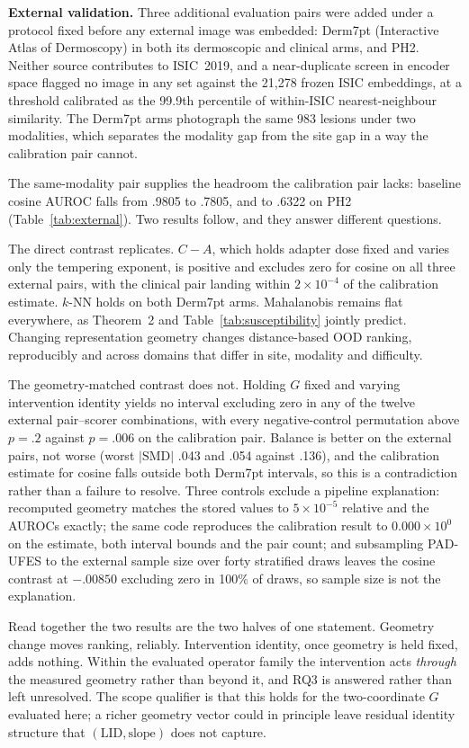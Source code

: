\documentclass[11pt,a4paper]{article}
\begin{document}
\label{sec:external}
\textbf{External validation.} Three additional evaluation pairs were added under a protocol fixed before any external image was embedded: Derm7pt (Interactive Atlas of Dermoscopy) in both its dermoscopic and clinical arms, and PH2. Neither source contributes to ISIC~2019, and a near-duplicate screen in encoder space flagged no image in any set against the 21{,}278 frozen ISIC embeddings, at a threshold calibrated as the 99.9th percentile of within-ISIC nearest-neighbour similarity. The Derm7pt arms photograph the same 983 lesions under two modalities, which separates the modality gap from the site gap in a way the calibration pair cannot.

The same-modality pair supplies the headroom the calibration pair lacks: baseline cosine AUROC falls from .9805 to .7805, and to .6322 on PH2 (Table~\ref{tab:external}). Two results follow, and they answer different questions.

The direct contrast replicates. $C-A$, which holds adapter dose fixed and varies only the tempering exponent, is positive and excludes zero for cosine on all three external pairs, with the clinical pair landing within $2\times10^{-4}$ of the calibration estimate. $k$-NN holds on both Derm7pt arms. Mahalanobis remains flat everywhere, as Theorem~2 and Table~\ref{tab:susceptibility} jointly predict. Changing representation geometry changes distance-based OOD ranking, reproducibly and across domains that differ in site, modality and difficulty.

The geometry-matched contrast does not. Holding $G$ fixed and varying intervention identity yields no interval excluding zero in any of the twelve external pair--scorer combinations, with every negative-control permutation above $p=.2$ against $p=.006$ on the calibration pair. Balance is better on the external pairs, not worse (worst $|\mathrm{SMD}|$ .043 and .054 against .136), and the calibration estimate for cosine falls outside both Derm7pt intervals, so this is a contradiction rather than a failure to resolve. Three controls exclude a pipeline explanation: recomputed geometry matches the stored values to $5\times10^{-5}$ relative and the AUROCs exactly; the same code reproduces the calibration result to $0.000\times10^{0}$ on the estimate, both interval bounds and the pair count; and subsampling PAD-UFES to the external sample size over forty stratified draws leaves the cosine contrast at $-.00850$ excluding zero in 100\% of draws, so sample size is not the explanation.

Read together the two results are the two halves of one statement. Geometry change moves ranking, reliably. Intervention identity, once geometry is held fixed, adds nothing. Within the evaluated operator family the intervention acts \emph{through} the measured geometry rather than beyond it, and RQ3 is answered rather than left unresolved. The scope qualifier is that this holds for the two-coordinate $G$ evaluated here; a richer geometry vector could in principle leave residual identity structure that $(\mathrm{LID},\text{slope})$ does not capture.
\end{document}

